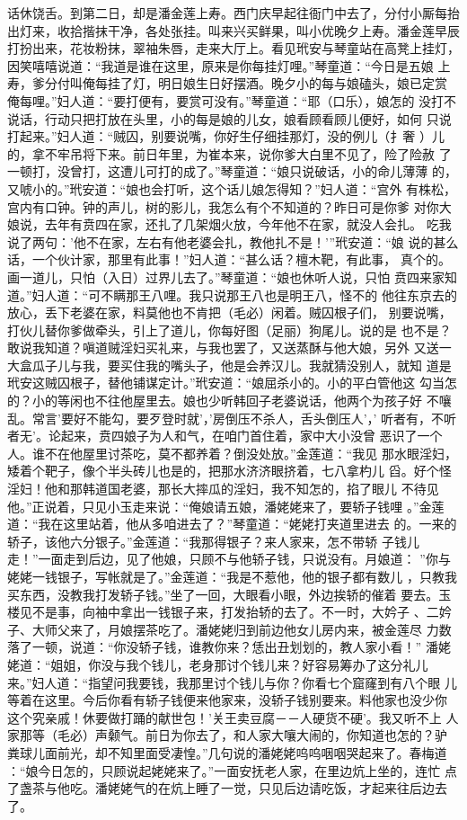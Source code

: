 话休饶舌。到第二日，却是潘金莲上寿。西门庆早起往衙门中去了，分付小厮每抬
出灯来，收拾揩抹干净，各处张挂。叫来兴买鲜果，叫小优晚夕上寿。潘金莲早辰
打扮出来，花妆粉抹，翠袖朱唇，走来大厅上。看见玳安与琴童站在高凳上挂灯，
因笑嘻嘻说道：“我道是谁在这里，原来是你每挂灯哩。”琴童道：“今日是五娘
上寿，爹分付叫俺每挂了灯，明日娘生日好摆酒。晚夕小的每与娘磕头，娘已定赏
俺每哩。”妇人道：“要打便有，要赏可没有。”琴童道：“耶（口乐），娘怎的
没打不说话，行动只把打放在头里，小的每是娘的儿女，娘看顾看顾儿便好，如何
只说打起来。”妇人道：“贼囚，别要说嘴，你好生仔细挂那灯，没的例儿（扌奢
）儿的，拿不牢吊将下来。前日年里，为崔本来，说你爹大白里不见了，险了险赦
了一顿打，没曾打，这遭儿可打的成了。”琴童道：“娘只说破话，小的命儿薄薄
的，又唬小的。”玳安道：“娘也会打听，这个话儿娘怎得知？”妇人道：“宫外
有株松，宫内有口钟。钟的声儿，树的影儿，我怎么有个不知道的？昨日可是你爹
对你大娘说，去年有贲四在家，还扎了几架烟火放，今年他不在家，就没人会扎。
吃我说了两句：'他不在家，左右有他老婆会扎，教他扎不是！'”玳安道：“娘
说的甚么话，一个伙计家，那里有此事！”妇人道：“甚么话？檀木靶，有此事，
真个的。画一道儿，只怕（入日）过界儿去了。”琴童道：“娘也休听人说，只怕
贲四来家知道。”妇人道：“可不瞒那王八哩。我只说那王八也是明王八，怪不的
他往东京去的放心，丢下老婆在家，料莫他也不肯把（毛必）闲着。贼囚根子们，
别要说嘴，打伙儿替你爹做牵头，引上了道儿，你每好图（足丽）狗尾儿。说的是
也不是？敢说我知道？嗔道贼淫妇买礼来，与我也罢了，又送蒸酥与他大娘，另外
又送一大盒瓜子儿与我，要买住我的嘴头子，他是会养汉儿。我就猜没别人，就知
道是玳安这贼囚根子，替他铺谋定计。”玳安道：“娘屈杀小的。小的平白管他这
勾当怎的？小的等闲也不往他屋里去。娘也少听韩回子老婆说话，他两个为孩子好
不嚷乱。常言'要好不能勾，要歹登时就'，'房倒压不杀人，舌头倒压人'，'
听者有，不听者无'。论起来，贲四娘子为人和气，在咱门首住着，家中大小没曾
恶识了一个人。谁不在他屋里讨茶吃，莫不都养着？倒没处放。”金莲道：“我见
那水眼淫妇，矮着个靶子，像个半头砖儿也是的，把那水济济眼挤着，七八拿杓儿
舀。好个怪淫妇！他和那韩道国老婆，那长大摔瓜的淫妇，我不知怎的，掐了眼儿
不待见他。”正说着，只见小玉走来说：“俺娘请五娘，潘姥姥来了，要轿子钱哩
。”金莲道：“我在这里站着，他从多咱进去了？”琴童道：“姥姥打夹道里进去
的。一来的轿子，该他六分银子。”金莲道：“我那得银子？来人家来，怎不带轿
子钱儿走！”一面走到后边，见了他娘，只顾不与他轿子钱，只说没有。月娘道：
”你与姥姥一钱银子，写帐就是了。”金莲道：“我是不惹他，他的银子都有数儿
，只教我买东西，没教我打发轿子钱。”坐了一回，大眼看小眼，外边挨轿的催着
要去。玉楼见不是事，向袖中拿出一钱银子来，打发抬轿的去了。不一时，大妗子
、二妗子、大师父来了，月娘摆茶吃了。潘姥姥归到前边他女儿房内来，被金莲尽
力数落了一顿，说道：“你没轿子钱，谁教你来？恁出丑划划的，教人家小看！”
潘姥姥道：“姐姐，你没与我个钱儿，老身那讨个钱儿来？好容易筹办了这分礼儿
来。”妇人道：“指望问我要钱，我那里讨个钱儿与你？你看七个窟窿到有八个眼
儿等着在这里。今后你看有轿子钱便来他家来，没轿子钱别要来。料他家也没少你
这个究亲戚！休要做打踊的献世包！'关王卖豆腐－－人硬货不硬'。我又听不上
人家那等（毛必）声颡气。前日为你去了，和人家大嚷大闹的，你知道也怎的？驴
粪球儿面前光，却不知里面受凄惶。”几句说的潘姥姥呜呜咽咽哭起来了。春梅道
：“娘今日怎的，只顾说起姥姥来了。”一面安抚老人家，在里边炕上坐的，连忙
点了盏茶与他吃。潘姥姥气的在炕上睡了一觉，只见后边请吃饭，才起来往后边去
了。

